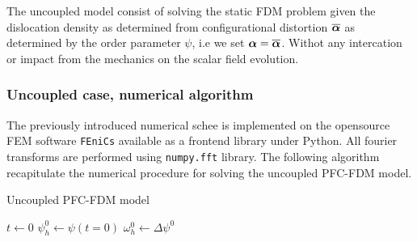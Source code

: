 \documentclass{article}
\begin{document}
The uncoupled model consist of solving the static FDM problem given the dislocation density as determined from configurational distortion $\overline{\bm{\mathit{\alpha}}}$ as determined by the order parameter $\psi$, i.e we set $\bm{\mathit{\alpha}} = \overline{\bm{\mathit{\alpha}}}$. Withot any intercation or impact from the mechanics on the scalar field evolution.

\subsubsection{Uncoupled case, numerical algorithm}
The previously introduced numerical schee is implemented on the opensource FEM software \texttt{FEniCs} available as a frontend library under Python. All fourier transforms are performed using \texttt{numpy.fft} library. The following algorithm recapitulate the numerical procedure for solving the uncoupled PFC-FDM model.\\


\begin{algorithm}[H]
   \caption{Uncoupled PFC-FDM model}\label{alg:UncoupledPFCFDM}
   $t \gets 0$ \;
   $\psi^0_h \gets \psi(t=0)$\;
   $\omega^0_h \gets \Delta \psi^0$ \;
\end{algorithm}
\end{document}
